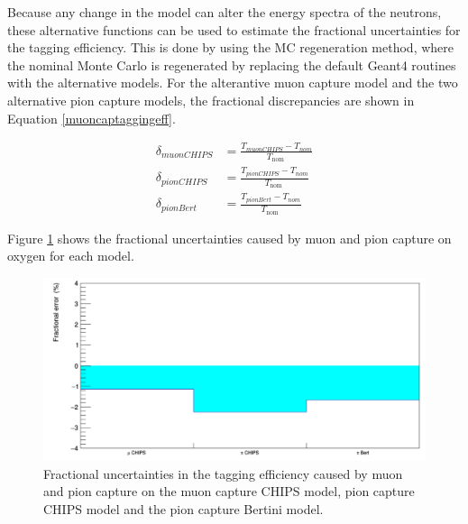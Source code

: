 Because any change in the model can alter the energy spectra of the neutrons, these alternative functions can be used to estimate the fractional uncertainties for the tagging efficiency. This is done by using the MC regeneration method, where the nominal Monte Carlo is regenerated by replacing the default Geant4 routines with the alternative models. For the alterantive muon capture model and the two alternative pion capture models, the fractional discrepancies are shown in Equation \ref{muoncaptaggingeff}.

\begin{equation}
    \begin{aligned}
        \delta_{muon C H I P S} &=\frac{T_{muon C H I P S}-T_{n o m}}{T_{\text {nom }}} \\
        \delta_{pion C H I P S} &=\frac{T_{pion C H I P S}-T_{n o m}}{T_{\text {nom }}} \\
        \delta_{pion B e r t} &=\frac{T_{pion B e r t}-T_{n o m}}{T_{\text {nom }}}
        \end{aligned}
        \label{muoncaptaggingeff}
\end{equation}

Figure \ref{fig:mupicap_uncertainty} shows the fractional uncertainties caused by muon and pion capture on oxygen for each model.

\begin{figure}
    \includegraphics[scale=0.4]{Figures/mupicap_uncertainty.png}
\caption{Fractional uncertainties in the tagging efficiency caused by muon and pion capture on the muon capture CHIPS model, pion capture CHIPS model and the pion capture Bertini model.}
\label{fig:mupicap_uncertainty}
\end{figure}


